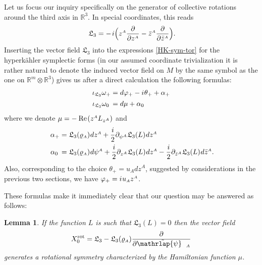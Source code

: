\documentclass[11pt]{amsart}
\newtheorem{lemma}[theorem]{Lemma}
\theoremstyle{remark}
\theoremstyle{remark}
\theoremstyle{definition}
\theoremstyle{definition}
\theoremstyle{definition}
\newcommand{\0}{{\scriptstyle 0'}} %
\newcommand{\1}{{\scriptstyle 1'}}
\newcommand{\A}{{\scriptscriptstyle A}} %
\newcommand{\pt}{\hspace{1pt}} %
\newcommand{\hp}{\hspace{0.5pt}} %
\renewcommand{\Re}{\hp\mbox{Re}\pt} %
\newcommand{\psitilde}{\raisebox{0.3pt}{\smash{$\tilde{\smash{\mathrlap{\psi}} \vphantom{\rule[6.5pt]{0pt}{0pt}} \hphantom{\hspace{10.5pt}}}$}} \hspace{-4.1pt}}
\begin{document}
Let us focus our inquiry specifically on the generator of collective rotations around the third axis in $\mathbb{R}^3$. In special coordinates, this reads
\begin{equation}
\mathfrak{L}_3 =  - \pt i \Big( z^{\A}\frac{\partial}{\partial {z^{\A}}} - \bar{z}^{\A}\frac{\partial}{\partial {\bar{z}^{\A}}} \Big) \rlap{.}
\end{equation}
Inserting the vector field $\mathfrak{L}_3$ into the expressions \eqref{HK-sym-tor} for the hyperk\"ahler symplectic forms (in our assumed coordinate trivialization it is rather natural to denote the induced vector field on $M$ by the same symbol as the one on $\mathbb{R}^m \otimes \mathbb{R}^{3}$) gives us after a direct calculation the following formulas:
\begin{equation} \label{baloo}
\begin{aligned}
\iota_{\mathfrak{L}_3} \omega_+ & =  d\varphi_+ - i \hp \theta_+ + \alpha_+ \\[1pt]
\iota_{\mathfrak{L}_3} \omega_0 \hspace{2pt}  & =  d\mu + \alpha_0
\end{aligned}
\end{equation}
where we denote $\mu = - \, \Re(z^{\A}L_{z^{\A}})$
and
\begin{equation} \label{alphas}
\begin{aligned}
\alpha_+ & = \mathfrak{L}_3(\varrho_{\A}) \hp dz^{\A} + \frac{i}{2}\partial_{\psi^{\A}}\mathfrak{L}_3(L) \hp dz^{\A} \\
\alpha_0 \hspace{2pt} & = \mathfrak{L}_3(\varrho_{\A}) \hp d\psi^{\A}  + \frac{i}{2}\partial_{z^{\A}}\mathfrak{L}_3(L) \hp dz^{\A} - \frac{i}{2}\partial_{\bar{z}^{\A}}\mathfrak{L}_3(L) \hp d\bar{z}^{\A} \rlap{.}
\end{aligned}
\end{equation}
Also, corresponding to the choice $\theta_+ = u_{\A} dz^{\A}$, suggested by considerations in the previous two sections, we have $\varphi_+ = i \hp u_{\A}z^{\A}$. 

These formulas make it immediately clear that our question may be answered as follows:

\begin{lemma} \label{L3-inv}
If the function $L$ is such that $\mathfrak{L}_3(L) = 0$ then the vector field
\begin{equation}
X^{\textup{rot}}_0 = \mathfrak{L}_3 - \mathfrak{L}_3(\varrho_{\A}) \frac{\partial}{\partial \psitilde_{\A}}
\end{equation}
generates a rotational symmetry characterized by the Hamiltonian function $\mu$.
\end{lemma}
\end{document}

